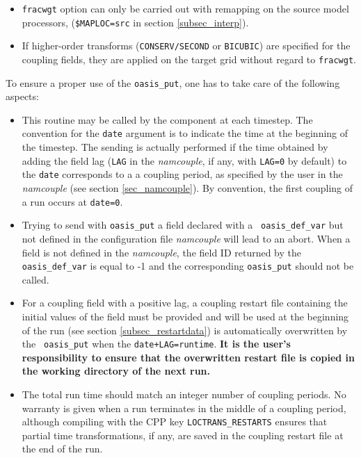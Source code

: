 \begin{itemize}
\begin{itemize}
\begin{itemize}
\item {\tt fracwgt} option can only be carried out with remapping on the source model processors, ({\tt \$MAPLOC=src} in section \ref{subsec_interp}).

\item If higher-order transforms ({\tt CONSERV/SECOND} or {\tt BICUBIC}) are specified for the coupling fields, they are applied on the target grid without regard to {\tt fracwgt}.

\end{itemize}
  \end{itemize}
\end{itemize}

To ensure a proper use of the {\tt oasis\_put}, one has to take care
of the following aspects:

\begin{itemize}

\item This routine may be called by the component at each timestep. The
  convention for the {\tt date} argument is to indicate the time at
  the beginning of the timestep. The sending is actually performed
  if the time obtained by adding the field lag ({\tt LAG} in the
  {\em namcouple}, if any, with {\tt LAG=0} by default) to the {\tt date} corresponds to a 
  a coupling period, as specified by
  the user in the {\it namcouple} (see section \ref{sec_namcouple}). By convention, the first coupling
  of a run occurs at {\tt date=0}.
  
\item Trying to send with {\tt oasis\_put} a field declared with a {\tt
  oasis\_def\_var} but not defined in the configuration file {\it
  namcouple} will lead to an abort. When a field is not defined in the {\it namcouple}, the field ID
returned by the {\tt oasis\_def\_var} is equal to -1 and the
corresponding {\tt oasis\_put} should not be called.

\item For a coupling field with a positive lag, a coupling restart file containing the initial values of the field must be provided and will be used at the beginning of the run (see section
  \ref{subsec_restartdata}) is automatically overwritten by the {\tt
    oasis\_put} when the {\tt date+LAG=runtime}. {\bf It is the user's responsibility to ensure that the overwritten restart file is copied in the working directory of the next run.}
    
\item The total run time should match an integer number of coupling periods. No warranty is given when a run terminates in the middle of a coupling period, although compiling with the CPP key {\tt LOCTRANS\_RESTARTS} ensures that partial time transformations, if any, are saved in the coupling restart file at the end of the run.


\end{itemize}
